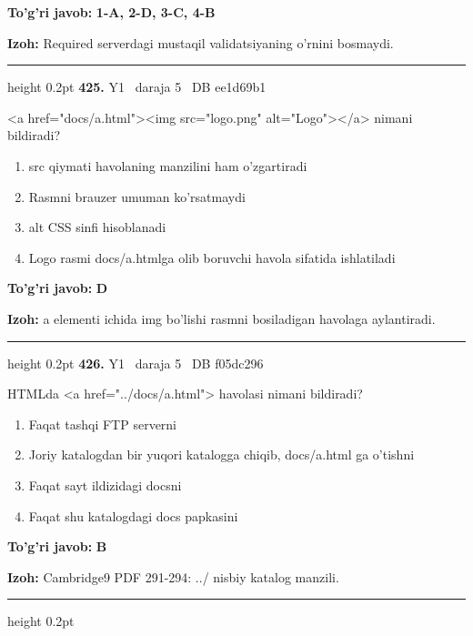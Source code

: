 \documentclass[10pt,a4paper,oneside]{article}
\begin{document}
\begin{tcolorbox}[enhanced,breakable,colback=teal!4,colframe=teal!45!black,boxrule=0.45pt,arc=1.2mm,left=2.8mm,right=2.8mm,top=2mm,bottom=2mm,before skip=2mm,after skip=2mm]
\textbf{\color{teal}To'g'ri javob:} \textbf{1-A, 2-D, 3-C, 4-B}
\par\smallskip
\textbf{Izoh:} Required serverdagi mustaqil validatsiyaning o'rnini bosmaydi.
\end{tcolorbox}
\vspace{2mm}\hrule height 0.2pt \vspace{4mm}
\hypertarget{q425}{\textbf{\color{ink}425.}}  {\color{muted}\scriptsize Y1 \textbullet\ daraja 5 \textbullet\ DB ee1d69b1}
\par
\textless{}a href="docs/a.html"\textgreater{}\textless{}img src="logo.png" alt="Logo"\textgreater{}\textless{}/a\textgreater{} nimani bildiradi?
\begin{enumerate}[label=\Alph*),leftmargin=9mm]
\item src qiymati havolaning manzilini ham o'zgartiradi
\item Rasmni brauzer umuman ko'rsatmaydi
\item alt CSS sinfi hisoblanadi
\item Logo rasmi docs/a.htmlga olib boruvchi havola sifatida ishlatiladi
\end{enumerate}
\begin{tcolorbox}[enhanced,breakable,colback=teal!4,colframe=teal!45!black,boxrule=0.45pt,arc=1.2mm,left=2.8mm,right=2.8mm,top=2mm,bottom=2mm,before skip=2mm,after skip=2mm]
\textbf{\color{teal}To'g'ri javob:} \textbf{D}
\par\smallskip
\textbf{Izoh:} a elementi ichida img bo'lishi rasmni bosiladigan havolaga aylantiradi.
\end{tcolorbox}
\vspace{2mm}\hrule height 0.2pt \vspace{4mm}
\hypertarget{q426}{\textbf{\color{ink}426.}}  {\color{muted}\scriptsize Y1 \textbullet\ daraja 5 \textbullet\ DB f05dc296}
\par
HTMLda \textless{}a href="../docs/a.html"\textgreater{} havolasi nimani bildiradi?
\begin{enumerate}[label=\Alph*),leftmargin=9mm]
\item Faqat tashqi FTP serverni
\item Joriy katalogdan bir yuqori katalogga chiqib, docs/a.html ga o'tishni
\item Faqat sayt ildizidagi docsni
\item Faqat shu katalogdagi docs papkasini
\end{enumerate}
\begin{tcolorbox}[enhanced,breakable,colback=teal!4,colframe=teal!45!black,boxrule=0.45pt,arc=1.2mm,left=2.8mm,right=2.8mm,top=2mm,bottom=2mm,before skip=2mm,after skip=2mm]
\textbf{\color{teal}To'g'ri javob:} \textbf{B}
\par\smallskip
\textbf{Izoh:} Cambridge9 PDF 291-294: ../ nisbiy katalog manzili.
\end{tcolorbox}
\vspace{2mm}\hrule height 0.2pt \vspace{4mm}
\end{document}
